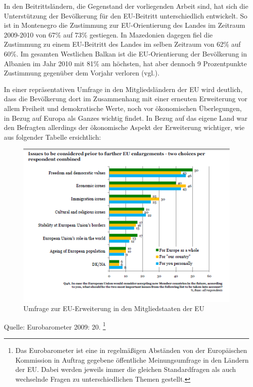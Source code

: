 In den Beitrittsländern, die Gegenstand der vorliegenden Arbeit sind, hat sich die Unterstützung der Bevölkerung für den EU-Beitritt unterschiedlich entwickelt. So ist in Montenegro die Zustimmung zur EU-Orientierung des Landes im Zeitraum 2009-2010 von 67\% auf 73\% gestiegen. In Mazedonien dagegen fiel die Zustimmung zu einem EU-Beitritt des Landes im selben Zeitraum von 62\% auf 60\%. Im gesamten Westlichen Balkan ist die EU-Orientierung der Bevölkerung in Albanien im Jahr 2010 mit 81\% am höchsten, hat aber dennoch 9 Prozentpunkte Zustimmung gegenüber dem Vorjahr verloren (vgl.\cite{gallup10}).\par
In einer repräsentativen Umfrage in den Mitgliedsländern der EU wird deutlich, dass die Bevölkerung dort im Zusammenhang mit einer erneuten Erweiterung vor allem Freiheit und demokratische Werte, noch vor ökonomischen Überlegungen, in Bezug auf Europa als Ganzes wichtig findet. In Bezug auf das eigene Land war den Befragten allerdings der ökonomische Aspekt der Erweiterung wichtiger, wie aus folgender Tabelle ersichtlich:
\begin{figure}[H]\centering
\setlength\belowcaptionskip{10pt}
  \caption{Umfrage zur EU-Erweiterung in den Mitgliedstaaten der EU }
  \includegraphics[width=5in]{Material/Umfrage}
\end{figure}
\vspace{-1cm}
{\centering Quelle: Eurobarometer 2009: 20. \footnote{Das Eurobarometer ist eine in regelmäßigen Abständen von der Europäischen Kommission in Auftrag gegebene öffentliche Meinungsumfrage in den Ländern der EU. Dabei werden jeweils immer die gleichen Standardfragen als auch wechselnde Fragen zu unterschiedlichen Themen gestellt.}
  \par
}

